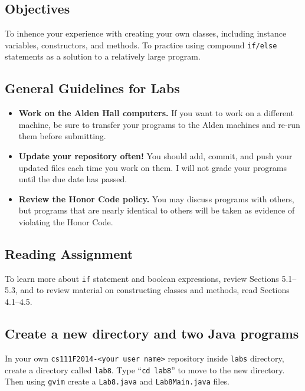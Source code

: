


\vspace{-0.2in}
\subsection*{Objectives}
\vspace{-0.05in}
To inhence your experience with creating your own classes, including instance variables, constructors, and methods. 
To practice using compound {\tt if/else} statements as a solution to a relatively large program.

\vspace{-0.15in}
\subsection*{General Guidelines for Labs}
\vspace{-0.05in}
\begin{itemize}
\item
{\bf Work on the Alden Hall computers.} If you want to work on a different
machine, be sure to transfer your programs to the Alden
machines and re-run them before submitting.
\item
{\bf Update your repository often!} You should add, commit, 
and push your updated files each time you work on them.  I will not grade 
your programs until the due date has passed.
\item
{\bf Review the Honor Code policy.} You
may discuss programs with others, but programs that are nearly identical
to others will be taken as evidence of violating the Honor Code.
\end{itemize}

\vspace{-0.15in}
\subsection*{Reading Assignment}
\vspace{-0.05in}
To learn more about {\tt if} statement and boolean expressions, review Sections 5.1--5.3, and to review material on constructing classes and methods, read Sections 4.1--4.5. 

\vspace{-0.1in}
\subsection*{Create a new directory and two Java programs}
\vspace{-0.05in}
In your own {\tt cs111F2014-<your user name>} repository inside {\tt labs} directory, create a directory called {\tt lab8}. Type ``{\tt cd lab8}'' to move to the new directory. Then using {\tt gvim} create a {\tt Lab8.java} and {\tt Lab8Main.java} files.

